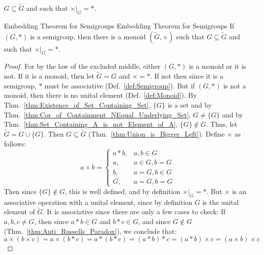    $G\subseteq\tilde{G}$ and such that $\times|_{G}=*$.
    \begin{ltheorem}{Embedding Theorem for Semigroups}
                    {Embedding Theorem for Semigroups}
        If $(G,*)$ is a semigroup, then there is a monoid $(\tilde{G},\times)$
        such that $G\subseteq\tilde{G}$ and such that $\times|_{G}=*$.
    \end{ltheorem}
    \begin{proof}
        For by the law of the excluded middle, either $(G,*)$ is a monoid or it
        is not. If it is a monoid, then let $\tilde{G}=G$ and $\times=*$. If not
        then since it is a semigroup, $*$ must be associative
        (Def.~\ref{def:Semigroup}). But if $(G,*)$ is not a monoid, then there
        is no unital element (Def.~\ref{def:Monoid}). By
        Thm.~\ref{thm:Existence_of_Set_Containing_Set}, $\{G\}$ is a set and by
        Thm.~\ref{thm:Cor_of_Containment_NEqual_Underlying_Set}, $G\ne\{G\}$
        and by Thm.~\ref{thm:Set_Containing_A_is_not_Element_of_A},
        $\{G\}\notin{G}$. Thus, let $\tilde{G}=G\cup\{G\}$. Then
        $G\subseteq\tilde{G}$ (Thm.~\ref{thm:Union_is_Bigger_Left}). Define
        $\times$ as follows:
        \begin{equation}
            a\times{b}=
            \begin{cases}
                a*b,&a,b\in{G}\\
                a,&a\in{G},b=G\\
                b,&a=G,b\in{G}\\
                G,&a=G,b=G
            \end{cases}
        \end{equation}
        Then since $\{G\}\notin{G}$, this is well defined, and by definition
        $\times|_{G}=*$. But $\times$ is an associative operation with a unital
        element, since by definition $G$ is the unital element of $\tilde{G}$.
        It is associative since there are only a few cases to check:
        If $a,b,c\ne{G}$, then since $a*b\in{G}$ and $b*c\in{G}$, and since
        $G\notin{G}$ (Thm.~\ref{thm:Anti_Russells_Paradox}), we conclude that:
        \begin{equation}
            a\times(b\times{c})=a\times(b*c)=a*(b*c)=(a*b)*c=
            (a*b)\times{c}=(a\times{b})\times{c}
        \end{equation}
    \end{proof}